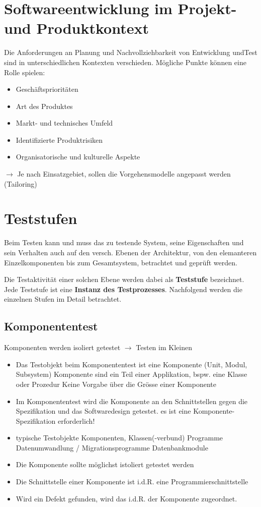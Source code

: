 \documentclass{report}
\theoremstyle{definition}
\theoremstyle{example}
\begin{document}
\section{Softwareentwicklung im Projekt- und Produktkontext}
Die Anforderungen an Planung und Nachvollziehbarkeit von Entwicklung undTest sind in unterschiedlichen Kontexten verschieden. Mögliche Punkte können eine Rolle spielen:
\begin{itemize}
   \item Geschäftsprioritäten
   \item Art des Produktes
   \item Markt- und technisches Umfeld
   \item Identifizierte Produktrisiken
   \item Organisatorische und kulturelle Aspekte
\end{itemize}
$\rightarrow$ Je nach Einsatzgebiet, sollen die Vorgehensmodelle angepasst werden (Tailoring)

\section{Teststufen}
Beim Testen kann und muss das zu testende System, seine Eigenschaften und sein Verhalten auch auf den versch. Ebenen der Architektur, von den elemanteren Einzelkomponenten bis zum Gesamtsystem, betrachtet und geprüft werden. 

Die Testaktivität einer solchen Ebene werden dabei als \textbf{Teststufe} bezeichnet. Jede Teststufe ist eine \textbf{Instanz des Testprozesses}. Nachfolgend werden die einzelnen Stufen im Detail betrachtet.

\subsection{Komponententest}
Komponenten werden isoliert getestet $\rightarrow$ Testen im Kleinen
\begin{itemize}
   \item Das Testobjekt beim Komponententest ist eine Komponente (Unit, Modul, Subsystem)
   \subitem Komponente sind ein Teil einer Applikation, bspw. eine Klasse oder Prozedur
   \subitem Keine Vorgabe über die Grösse einer Komponente
   \item Im Komponententest wird die Komponente an den Schnittstellen gegen die Spezifikation und das Softwaredesign getestet.
   \subitem es ist eine Komponente-Spezifikation erforderlich!  
   \item typische Testobjekte
   \subitem Komponenten, Klassen(-verbund)
   \subitem Programme
   \subitem Datenumwandlung / Migrationsprogramme
   \subitem Datenbankmodule
   \item Die Komponente sollte möglichst istoliert getestet werden
   \item Die Schnittstelle einer Komponente ist i.d.R. eine Programmierschnittstelle
   \item Wird ein Defekt gefunden, wird das i.d.R. der Komponente zugeordnet. 
\end{itemize}
\end{document}

